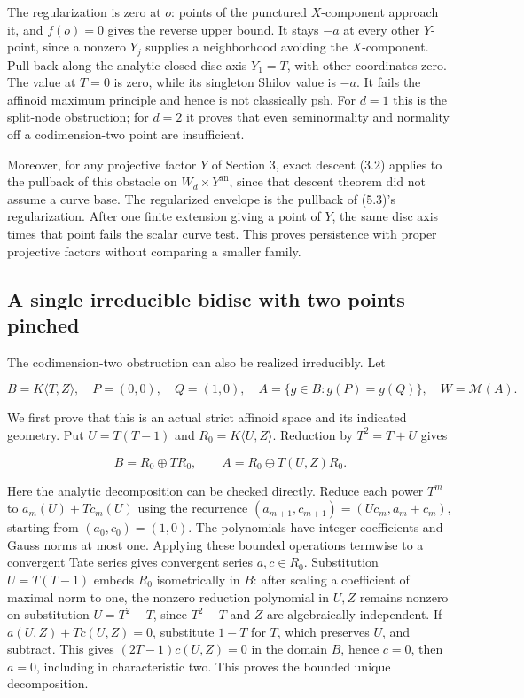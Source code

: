 \documentclass[11pt,a4paper]{article}
\begin{document}
The regularization is zero at \(o\): points of the punctured \(X\)-component approach it, and \(f(o)=0\) gives the reverse upper bound. It stays \(-a\) at every other \(Y\)-point, since a nonzero \(Y_j\) supplies a neighborhood avoiding the \(X\)-component. Pull back along the analytic closed-disc axis \(Y_1=T\), with other coordinates zero. The value at \(T=0\) is zero, while its singleton Shilov value is \(-a\). It fails the affinoid maximum principle and hence is not classically psh. For \(d=1\) this is the split-node obstruction; for \(d=2\) it proves that even seminormality and normality off a codimension-two point are insufficient.

Moreover, for any projective factor \(Y\) of Section 3, exact descent (3.2) applies to the pullback of this obstacle on \(W_d\times Y^{\mathrm{an}}\), since that descent theorem did not assume a curve base. The regularized envelope is the pullback of (5.3)'s regularization. After one finite extension giving a point of \(Y\), the same disc axis times that point fails the scalar curve test. This proves persistence with proper projective factors without comparing a smaller family.

\subsection*{A single irreducible bidisc with two points pinched}

The codimension-two obstruction can also be realized irreducibly. Let

\[
B=K\langle T,Z\rangle,\quad P=(0,0),\quad Q=(1,0),\quad
A=\{g\in B:g(P)=g(Q)\},\quad W=\mathcal M(A).
\]

We first prove that this is an actual strict affinoid space and its indicated geometry. Put \(U=T(T-1)\) and \(R_0=K\langle U,Z\rangle\). Reduction by \(T^2=T+U\) gives

\[
B=R_0\oplus T R_0,\qquad
A=R_0\oplus T(U,Z)R_0. \tag{5.4}
\]

Here the analytic decomposition can be checked directly. Reduce each power \(T^m\) to \(a_m(U)+Tc_m(U)\) using the recurrence \((a_{m+1},c_{m+1})=(Uc_m,a_m+c_m)\), starting from \((a_0,c_0)=(1,0)\). The polynomials have integer coefficients and Gauss norms at most one. Applying these bounded operations termwise to a convergent Tate series gives convergent series \(a,c\in R_0\). Substitution \(U=T(T-1)\) embeds \(R_0\) isometrically in \(B\): after scaling a coefficient of maximal norm to one, the nonzero reduction polynomial in \(U,Z\) remains nonzero on substitution \(U=T^2-T\), since \(T^2-T\) and \(Z\) are algebraically independent. If \(a(U,Z)+Tc(U,Z)=0\), substitute \(1-T\) for \(T\), which preserves \(U\), and subtract. This gives \((2T-1)c(U,Z)=0\) in the domain \(B\), hence \(c=0\), then \(a=0\), including in characteristic two. This proves the bounded unique decomposition.
\end{document}
